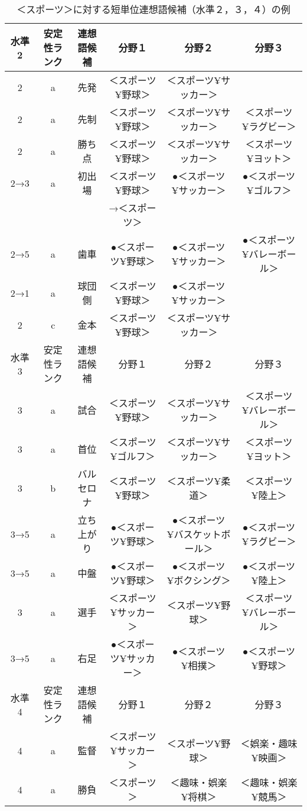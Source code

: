 \begin{sidewaystable}[p]
 \caption{＜スポーツ＞に対する短単位連想語候補（水準２，３，４）の例}
 \begin{center}
\small
  \begin{tabular}{cccccc}
   \hline\hline
水準2 & 安定性ランク & 連想語候補 & 分野１ & 分野２ & 分野３ \\
    \hline
2 & a & 先発 & ＜スポーツ¥野球＞ & ＜スポーツ¥サッカー＞ \\
2 & a & 先制 & ＜スポーツ¥野球＞ & ＜スポーツ¥サッカー＞ & ＜スポーツ¥ラグビー＞ \\
2 & a & 勝ち点 & ＜スポーツ¥野球＞ & ＜スポーツ¥サッカー＞ & ＜スポーツ¥ヨット＞ \\
2→3 & a & 初出場 & ＜スポーツ¥野球＞ & ●＜スポーツ¥サッカー＞ & ●＜スポーツ¥ゴルフ＞ \\
 &  &  & →＜スポーツ＞ \\
2→5 & a & 歯車 & ●＜スポーツ¥野球＞ & ●＜スポーツ¥サッカー＞ & ●＜スポーツ¥バレーボール＞ \\
2→1 & a & 球団側 & ＜スポーツ¥野球＞ & ●＜スポーツ¥サッカー＞ \\
2 & c & 金本 & ＜スポーツ¥野球＞ & ＜スポーツ¥サッカー＞ \\
    \hline\hline
水準3 & 安定性ランク & 連想語候補 & 分野１ & 分野２ & 分野３ \\
    \hline
3 & a & 試合 & ＜スポーツ¥野球＞ & ＜スポーツ¥サッカー＞ & ＜スポーツ¥バレーボール＞ \\
3 & a & 首位 & ＜スポーツ¥ゴルフ＞ & ＜スポーツ¥サッカー＞ & ＜スポーツ¥ヨット＞ \\
3 & b & バルセロナ & ＜スポーツ¥野球＞ & ＜スポーツ¥柔道＞ & ＜スポーツ¥陸上＞ \\
3→5 & a & 立ち上がり & ●＜スポーツ¥野球＞ & ●＜スポーツ¥バスケットボール＞ & ●＜スポーツ¥ラグビー＞ \\
3→5 & a & 中盤 & ●＜スポーツ¥野球＞ & ●＜スポーツ¥ボクシング＞ & ●＜スポーツ¥陸上＞ \\
3 & a & 選手 & ＜スポーツ¥サッカー＞ & ＜スポーツ¥野球＞ & ＜スポーツ¥バレーボール＞ \\
3→5 & a & 右足 & ●＜スポーツ¥サッカー＞ & ●＜スポーツ¥相撲＞ & ●＜スポーツ¥野球＞ \\
    \hline\hline
水準4 & 安定性ランク & 連想語候補 & 分野１ & 分野２ & 分野３ \\
    \hline
4 & a & 監督 & ＜スポーツ¥サッカー＞ & ＜スポーツ¥野球＞ & ＜娯楽・趣味¥映画＞ \\
4 & a & 勝負 & ＜スポーツ＞ & ＜趣味・娯楽¥将棋＞ & ＜趣味・娯楽¥競馬＞ \\

\end{tabular}
\end{center}
\end{sidewaystable}
